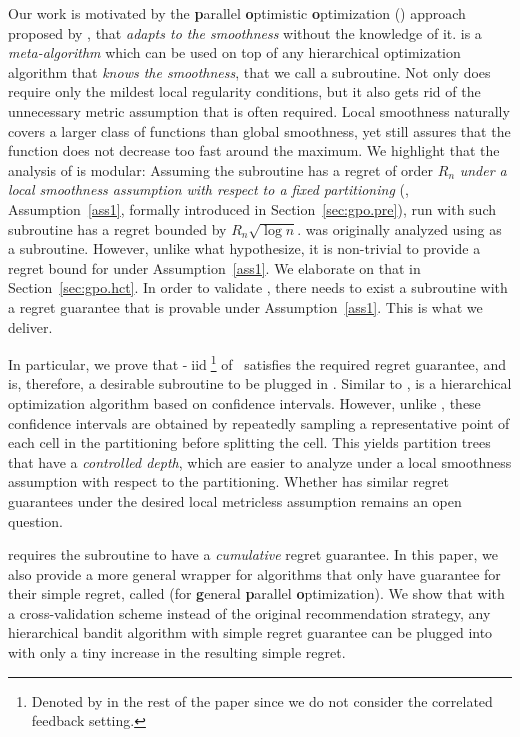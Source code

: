 Our work is motivated by the \textbf{p}arallel \textbf{o}ptimistic \textbf{o}ptimization (\POO) approach proposed by \citet{grill2015poo},  that \emph{adapts to the smoothness} without the knowledge of it. \POO is a \textit{meta-algorithm} which can be used on top of any hierarchical optimization algorithm that \emph{knows the smoothness}, that we call a subroutine. Not only does \POO require only the mildest local regularity conditions, but it also gets rid of the unnecessary metric assumption that is often required. Local smoothness naturally covers a larger class of functions than global smoothness, yet still assures that the function does not decrease too fast around the maximum. We highlight that the analysis of \POO is modular: Assuming the subroutine has a regret of order $R_n$ \emph{under a local smoothness assumption with respect to a fixed partitioning} (\citealt{grill2015poo}, Assumption~\ref{ass1}, formally introduced in Section~\ref{sec:gpo.pre}), \POO run with such subroutine has a regret bounded by $R_n \sqrt{\log n}$. \POO was originally analyzed using \HOO as a subroutine. However, unlike what \citet{grill2015poo} hypothesize, it is non-trivial to provide a regret bound for \HOO under Assumption~\ref{ass1}. We elaborate on that in Section~\ref{sec:gpo.hct}. In order to validate \POO,  there needs to exist a subroutine with a  regret guarantee that is provable under Assumption~\ref{ass1}. This is what we deliver.

In particular, we prove that \HCT-$\operatorname{iid}$\footnote{Denoted by \HCT in the rest of the paper since we do not consider the correlated feedback setting.} of~\cite{azar2014online} satisfies the required regret guarantee, and is, therefore, a desirable subroutine to be plugged in \POO. Similar to \HOO, \HCT is a hierarchical optimization algorithm based on confidence intervals. However, unlike \HOO, these confidence intervals are obtained by repeatedly sampling a representative point of each cell in the partitioning before splitting the cell. This yields partition trees that have a \emph{controlled depth}, which are easier to analyze under a local smoothness assumption with respect to the partitioning. Whether \HOO has similar regret guarantees under the desired local metricless assumption remains an open question.

\POO requires the subroutine to have a \emph{cumulative} regret guarantee. In this paper, we also provide a more general wrapper for algorithms that only have guarantee for their simple regret, called \GPO (for \textbf{g}eneral \textbf{p}arallel \textbf{o}ptimization). We show that with a cross-validation scheme instead of the original recommendation strategy, any hierarchical bandit algorithm with simple regret guarantee can be plugged into \GPO with only a tiny increase in the resulting simple regret.

